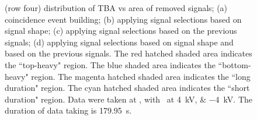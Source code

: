 \begin{landscape}
\begin{figure}[!p]
{			(row four) distribution of TBA vs area of removed signals;
			(a) coincidence event building; 
			(b) applying signal selections based on signal shape;
			(c) applying signal selections based on the previous signals;
			(d) applying signal selections based on signal shape and based on the previous signals.
			The red hatched shaded area indicates the ``top-heavy" region.
			The blue shaded area indicates the ``bottom-heavy" region.
			The magenta hatched shaded area indicates the ``long duration" region.
			The cyan hatched shaded area indicates the ``short duration" region.
			Data were taken at , with \opvtvb\ at \SIlist{+4;-4}{kV}. The duration of data taking is \SI{179.95}{\s}.
		}
		\label{fig:signal selection dv 08}
	\end{figure}
\end{landscape}
